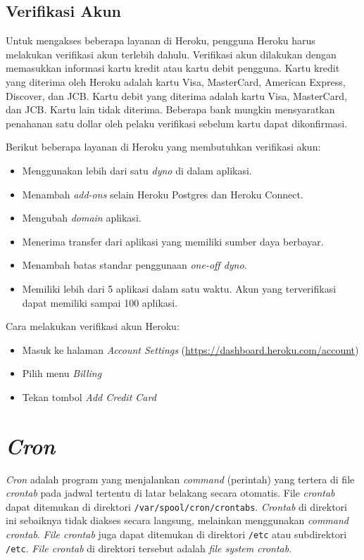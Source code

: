 \subsection{Verifikasi Akun}
Untuk mengakses beberapa layanan di Heroku, pengguna Heroku harus melakukan verifikasi akun terlebih dahulu. Verifikasi akun dilakukan dengan memasukkan informasi kartu kredit atau kartu debit pengguna. Kartu kredit yang diterima oleh Heroku adalah kartu Visa, MasterCard, American Express, Discover, dan JCB. Kartu debit yang diterima adalah kartu Visa, MasterCard, dan JCB. Kartu lain tidak diterima. Beberapa bank mungkin mensyaratkan penahanan satu dollar oleh pelaku verifikasi sebelum kartu dapat dikonfirmasi.

Berikut beberapa layanan di Heroku yang membutuhkan verifikasi akun:
\begin{itemize}
\item Menggunakan lebih dari satu \textit{dyno} di dalam aplikasi.
\item Menambah \textit{add-ons} selain Heroku Postgres dan Heroku Connect.
\item Mengubah \textit{domain} aplikasi.
\item Menerima transfer dari aplikasi yang memiliki sumber daya berbayar.
\item Menambah batas standar penggunaan \textit{one-off dyno}.
\item Memiliki lebih dari 5 aplikasi dalam satu waktu. Akun yang terverifikasi dapat memiliki sampai 100 aplikasi.
\end{itemize}

Cara melakukan verifikasi akun Heroku:
\begin{itemize}
\item Masuk ke halaman \textit{Account Settings} (\url{https://dashboard.heroku.com/account})
\item Pilih menu \textit{Billing}
\item Tekan tombol \textit{Add Credit Card}
\end{itemize}

\section{\textit{Cron} ~\cite{vixie1cron}}
\label{cron}
\textit{Cron} adalah program yang menjalankan \textit{command} (perintah) yang tertera di file \textit{crontab} pada jadwal tertentu di latar belakang secara otomatis. File \textit{crontab} dapat ditemukan di direktori \texttt{/var/spool/cron/crontabs}. \textit{Crontab} di direktori ini sebaiknya tidak diakses secara langsung, melainkan menggunakan \textit{command crontab}. \textit{File crontab} juga dapat ditemukan di direktori \texttt{/etc} atau subdirektori \texttt{/etc}. \textit{File crontab} di direktori tersebut adalah \textit{file system crontab}.

